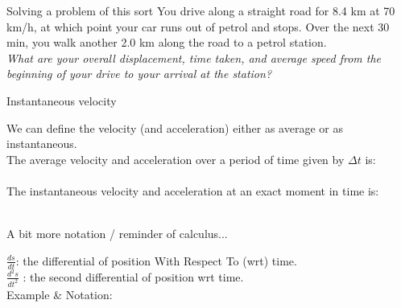 %   
\begin{frame}{Solving a problem of this sort}
\small
You drive along a straight road for 8.4 km at 70 km/h, at which point your car runs out of petrol and stops. Over the next 30 min, you walk another 2.0 km along the road to a petrol station.\\[1ex]
\textit{What are your overall displacement, time taken, and average speed from the beginning of your drive to your arrival at the station?}\\[1ex]

\vspace{5cm}
\end{frame}

 
\begin{frame}{Instantaneous velocity}

We can define the velocity (and acceleration) either as average or as instantaneous.\\[2ex]

The average velocity and acceleration over a period of time given by $\Delta t$ is: \\[2ex]
 \\[2ex]

The instantaneous velocity and acceleration  at an exact moment in time is: \\[2ex]
 \\[1ex]
\end{frame}



%  
\begin{frame}{A bit more notation / reminder of calculus...}

$\frac{d s }{d t} $: the differential of position With Respect To (wrt) time.\\[1ex]
$\frac{d^2 s }{d t^2} $ : the second differential of position wrt time.\\[3ex]

Example \& Notation: \\[10ex]






\end{frame}

